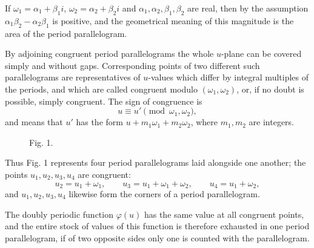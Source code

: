 \documentclass[11pt]{article}
\begin{document}
If $\omega_1=\alpha_1+\beta_1 i$, $\omega_2=\alpha_2+\beta_2 i$ and $\alpha_1,\alpha_2,\beta_1,\beta_2$ are real, then by the assumption $\alpha_1\beta_2-\alpha_2\beta_1$ is positive, and the geometrical meaning of this magnitude is the area of the period parallelogram.

By adjoining congruent period parallelograms the whole $u$-plane can be covered simply and without gaps. Corresponding points of two different such parallelograms are representatives of $u$-values which differ by integral multiples of the periods, and which are called congruent modulo $(\omega_1,\omega_2)$, or, if no doubt is possible, simply congruent. The sign of congruence is
\[
u\equiv u'\pmod{\omega_1,\omega_2},
\]
and means that $u'$ has the form $u+m_1\omega_1+m_2\omega_2$, where $m_1,m_2$ are integers.


\begin{figure}[ht]
\centering
{}
\caption{Fig. 1.}
\end{figure}


Thus Fig. 1 represents four period parallelograms laid alongside one another; the points $u_1,u_2,u_3,u_4$ are congruent:
\[
u_2=u_1+\omega_1,\qquad u_3=u_1+\omega_1+\omega_2,\qquad u_4=u_1+\omega_2,
\]
and $u_1,u_2,u_3,u_4$ likewise form the corners of a period parallelogram.

The doubly periodic function $\varphi(u)$ has the same value at all congruent points, and the entire stock of values of this function is therefore exhausted in one period parallelogram, if of two opposite sides only one is counted with the parallelogram.
\end{document}
